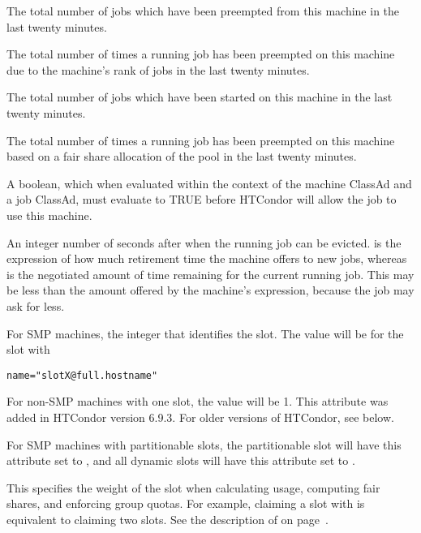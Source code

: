 \begin{description}
%
\item[\AdAttr{RecentJobPreemptions}:] The total number of jobs which
have been preempted from this machine in the last twenty minutes.
%
\item[\AdAttr{RecentJobRankPreemptions}:] The total number of times
a running job has been preempted on this machine due to the machine's
rank of jobs in the last twenty minutes.  
%
\item[\AdAttr{RecentJobStarts}:] The total number of jobs which
have been started on this machine in the last twenty minutes.
%
\item[\AdAttr{RecentJobUserPrio}:] The total number of times
a running job has been preempted on this machine based on a fair share
allocation of the pool 
in the last twenty minutes.
%
\item[\AdAttr{Requirements}:] A boolean, which when evaluated within the context
of the machine ClassAd and a job ClassAd, must evaluate to
TRUE before HTCondor will allow the job to use this machine.
%
\item[\AdAttr{RetirementTimeRemaining}:] An integer number of seconds
after  when the running job can be evicted.
 is the expression of how much retirement
time the machine offers to new jobs, whereas 
is the negotiated amount of time remaining for the current running
job.  This may be less than the amount offered by the machine's
 expression, because the job may
ask for less.
%
\item[\AdAttr{SlotID}:] For SMP machines, the integer
that identifies the slot.
The value will be \verb@X@ for the slot with 
\begin{verbatim}
name="slotX@full.hostname"
\end{verbatim}
For non-SMP machines with one slot, the value will be 1.
\Note This attribute was added in HTCondor version 6.9.3.
For older versions of HTCondor, see  below.
%
\label{SlotType-machine-attribute} 
\item[\AdAttr{SlotType}:] For SMP machines with partitionable slots,
the partitionable slot will have this attribute set to ,
and all dynamic slots will have this attribute set to .
%
\item[\AdAttr{SlotWeight}:]
  This specifies the weight of the slot when
  calculating usage, computing fair shares, and enforcing group
  quotas.  For example, claiming a slot with  is
  equivalent to claiming two  slots.
  See the description of  on
  page~\pageref{param:SlotWeight}.


\end{description}
